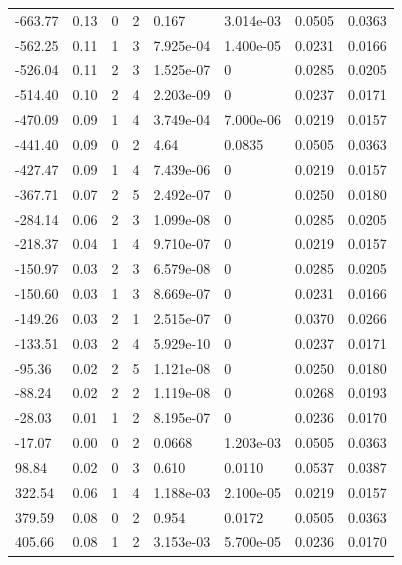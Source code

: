 \documentclass[preview]{standalone}
\begin{document}
{{\begin{tabular}{L{1.2cm}C{1.2cm} C{0.3cm}C{0.5cm} C{1.4cm}C{1.4cm} C{1.4cm}C{1.4cm}}
  -663.77  &  0.13  & 0     &  2 &  0.167  & 3.014e-03  & 0.0505 &  0.0363   \\ 
  -562.25  &  0.11  & 1     &  3 &  7.925e-04  & 1.400e-05  & 0.0231 &  0.0166   \\ 
  -526.04  &  0.11  & 2     &  3 &  1.525e-07  & 0  & 0.0285 &  0.0205   \\ 
  -514.40  &  0.10  & 2     &  4 &  2.203e-09  & 0  & 0.0237 &  0.0171   \\ 
  -470.09  &  0.09  & 1     &  4 &  3.749e-04  & 7.000e-06  & 0.0219 &  0.0157   \\ 
  -441.40  &  0.09  & 0     &  2 &  4.64  & 0.0835  & 0.0505 &  0.0363   \\ 
  -427.47  &  0.09  & 1     &  4 &  7.439e-06  & 0  & 0.0219 &  0.0157   \\ 
  -367.71  &  0.07  & 2     &  5 &  2.492e-07  & 0  & 0.0250 &  0.0180   \\ 
  -284.14  &  0.06  & 2     &  3 &  1.099e-08  & 0  & 0.0285 &  0.0205   \\ 
  -218.37  &  0.04  & 1     &  4 &  9.710e-07  & 0  & 0.0219 &  0.0157   \\ 
  -150.97  &  0.03  & 2     &  3 &  6.579e-08  & 0  & 0.0285 &  0.0205   \\ 
  -150.60  &  0.03  & 1     &  3 &  8.669e-07  & 0  & 0.0231 &  0.0166   \\ 
  -149.26  &  0.03  & 2     &  1 &  2.515e-07  & 0  & 0.0370 &  0.0266   \\ 
  -133.51  &  0.03  & 2     &  4 &  5.929e-10  & 0  & 0.0237 &  0.0171   \\ 
  -95.36  &  0.02  & 2     &  5 &  1.121e-08  & 0  & 0.0250 &  0.0180   \\ 
  -88.24  &  0.02  & 2     &  2 &  1.119e-08  & 0  & 0.0268 &  0.0193   \\ 
  -28.03  &  0.01  & 1     &  2 &  8.195e-07  & 0  & 0.0236 &  0.0170   \\ 
  -17.07  &  0.00  & 0     &  2 &  0.0668  & 1.203e-03  & 0.0505 &  0.0363   \\ 
  98.84  &  0.02  & 0     &  3 &  0.610  & 0.0110  & 0.0537 &  0.0387   \\ 
  322.54  &  0.06  & 1     &  4 &  1.188e-03  & 2.100e-05  & 0.0219 &  0.0157   \\ 
  379.59  &  0.08  & 0     &  2 &  0.954  & 0.0172  & 0.0505 &  0.0363   \\ 
  405.66  &  0.08  & 1     &  2 &  3.153e-03  & 5.700e-05  & 0.0236 &  0.0170   \\ 

\end{tabular}}}
\end{document}

